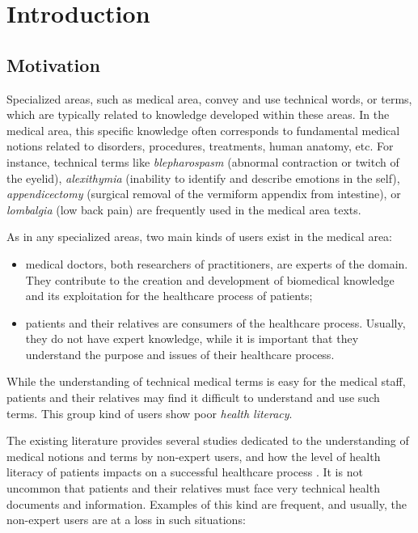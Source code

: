 \chapter{Introduction}

\section{Motivation}
Specialized areas, such as medical area, convey and use technical words, or terms, which are typically related to knowledge developed within these areas. In the medical area, this specific knowledge often corresponds to fundamental medical notions related to disorders, procedures, treatments, human anatomy, etc. For instance, technical terms like \textit{blepharospasm} (abnormal contraction or twitch of the eyelid), \textit{alexithymia} (inability to identify and describe emotions in the self), \textit{appendicectomy} (surgical removal of the vermiform appendix from intestine), or \textit{lombalgia} (low back pain) are frequently used in the medical area texts.

As in any specialized areas, two main kinds of users exist in the medical area:

\begin{itemize}
    \item medical doctors, both researchers of practitioners, are experts of the domain. They contribute to the creation and development of biomedical knowledge and its exploitation for the healthcare process of patients;
    
    \item patients and their relatives are consumers of the healthcare process. Usually, they do not have expert knowledge, while it is important that they understand the purpose and issues of their healthcare process. 
\end{itemize}
While the understanding of technical medical terms is easy for the medical staff, patients and their relatives may find it difficult to understand and use such terms. This group kind of users show poor \textit{health literacy}. 

The existing literature provides several studies dedicated to the understanding of medical notions and terms by non-expert users, and how the level of health literacy of patients impacts on a successful healthcare process \citep{McCray-JAMIA2005, Eysenbach-JMIR2007}. It is not uncommon that patients and their relatives must face very technical health documents and information. Examples of this kind are frequent, and usually, the non-expert users are at a loss in such situations:

